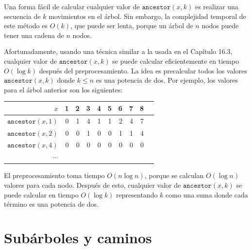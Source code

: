 Una forma fácil de calcular cualquier valor de $\texttt{ancestor}(x,k)$
es realizar una secuencia de $k$ movimientos en el árbol.
Sin embargo, la complejidad temporal de este método
es $O(k)$, que puede ser lenta, porque un árbol de $n$
nodos puede tener una cadena de $n$ nodos.

Afortunadamente, usando una técnica similar a la
usada en el Capítulo 16.3, cualquier valor de $\texttt{ancestor}(x,k)$
se puede calcular eficientemente en tiempo $O(\log k)$
después del preprocesamiento.
La idea es precalcular todos los valores $\texttt{ancestor}(x,k)$
donde $k \le n$ es una potencia de dos.
Por ejemplo, los valores para el árbol anterior
son los siguientes:

\begin{center}
\begin{tabular}{r|rrrrrrrrr}
$x$ & 1 & 2 & 3 & 4 & 5 & 6 & 7 & 8 \\
\hline
$\texttt{ancestor}(x,1)$ & 0 & 1 & 4 & 1 & 1 & 2 & 4 & 7 \\
$\texttt{ancestor}(x,2)$ & 0 & 0 & 1 & 0 & 0 & 1 & 1 & 4 \\
$\texttt{ancestor}(x,4)$ & 0 & 0 & 0 & 0 & 0 & 0 & 0 & 0 \\
$\cdots$ \\
\end{tabular}
\end{center}

El preprocesamiento toma tiempo $O(n \log n)$,
porque se calculan $O(\log n)$ valores para cada nodo.
Después de esto, cualquier valor de $\texttt{ancestor}(x,k)$ se puede calcular
en tiempo $O(\log k)$ representando $k$
como una suma donde cada término es una potencia de dos.

\section{Subárboles y caminos}


